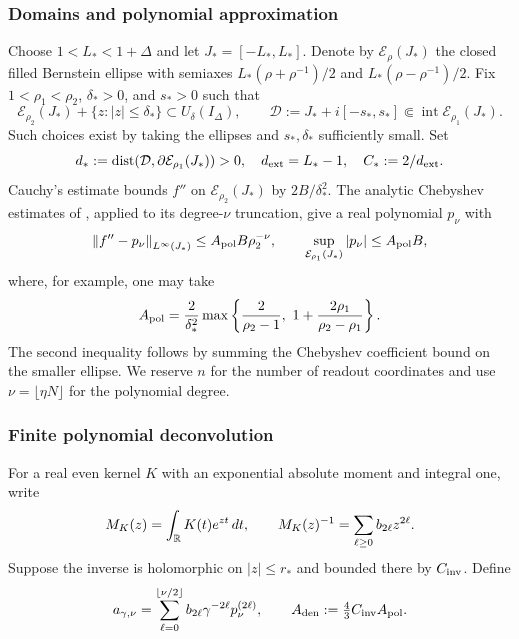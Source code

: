 \subsubsection{Domains and polynomial approximation}
Choose $1<L_*<1+\Delta$ and let $J_*=[-L_*,L_*]$. Denote by
$\mathcal E_\rho(J_*)$ the closed filled Bernstein ellipse with semiaxes
$L_*(\rho+\rho^{-1})/2$ and $L_*(\rho-\rho^{-1})/2$.
Fix $1<\rho_1<\rho_2$, $\delta_*>0$, and $s_*>0$ such that
\begin{equation}
 \mathcal E_{\rho_2}(J_*)+\{z:|z|\le\delta_*\}
 \subset U_\delta(I_\Delta),\qquad
 \mathcal D:=J_*+i[-s_*,s_*]\Subset\operatorname{int}\mathcal E_{\rho_1}(J_*).
 \label{eq:psi-domains}
\end{equation}
Such choices exist by taking the ellipses and $s_*,\delta_*$ sufficiently
small. Set
\begin{equation}
 d_*:=\operatorname{dist}(\mathcal D,\partial\mathcal E_{\rho_1}(J_*))>0,
 \quad d_{\rm ext}=L_*-1,\quad C_*:=2/d_{\rm ext}.
 \label{eq:psi-margins}
\end{equation}
Cauchy's estimate bounds $f''$ on $\mathcal E_{\rho_2}(J_*)$ by
$2B/\delta_*^2$. The analytic Chebyshev estimates of
\cite[Ch.~8]{trefethen2019atap}, applied to its degree-$\nu$ truncation,
give a real polynomial $p_\nu$ with
\begin{equation}
 \left\lVert f''-p_\nu\right\rVert_{L^\infty(J_*)}\le A_{\rm pol}B\rho_2^{-\nu},\qquad
 \sup_{\mathcal E_{\rho_1}(J_*)}|p_\nu|\le A_{\rm pol}B,
 \label{eq:psi-poly}
\end{equation}
where, for example, one may take
\begin{equation}
 A_{\rm pol}=\frac2{\delta_*^2}
 \max\left\{\frac2{\rho_2-1},\ 1+\frac{2\rho_1}{\rho_2-\rho_1}\right\}.
 \label{eq:Apol}
\end{equation}
The second inequality follows by summing the Chebyshev coefficient bound on
the smaller ellipse. We reserve $n$ for the number of readout coordinates
and use $\nu=\lfloor\eta N\rfloor$ for the polynomial degree.

\subsubsection{Finite polynomial deconvolution}
For a real even kernel $K$ with an exponential absolute moment and integral one,
write
\begin{equation}
 M_K(z)=\int_\mathbb R K(t)e^{zt}\,dt,\qquad
 M_K(z)^{-1}=\sum_{\ell\ge0}b_{2\ell}z^{2\ell}.
 \label{eq:psi-mgf}
\end{equation}
Suppose the inverse is holomorphic on $|z|\le r_*$ and bounded there by
$C_{\rm inv}$. Define
\begin{equation}
 a_{\gamma,\nu}
 =\sum_{\ell=0}^{\lfloor\nu/2\rfloor}
 b_{2\ell}\gamma^{-2\ell}p_\nu^{(2\ell)},\qquad
 A_{\rm den}:=\tfrac43 C_{\rm inv}A_{\rm pol}.
 \label{eq:psi-deconv}
\end{equation}

